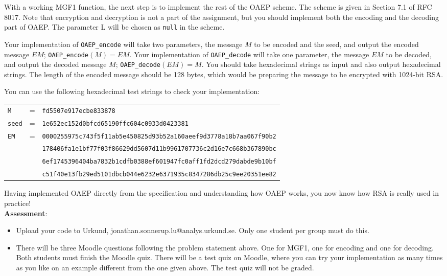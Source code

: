 \documentclass{article}
\begin{document}
\begin{description}
{				With a working MGF1 function, the next step is to implement the rest of the OAEP scheme. The scheme is given in Section 7.1 of RFC 8017. Note that encryption and decryption is not a part of the assignment, but you should implement both the encoding and the decoding part of OAEP. The parameter L will be chosen as \texttt{null} in the scheme.
				
				Your implementation of \texttt{OAEP\_encode} will take two parameters, the message $M$ to be encoded and the seed, and output the encoded message $\textit{EM}$; \texttt{OAEP\_encode}$(M)=\textit{EM}$.
				Your implementation of \texttt{OAEP\_decode} will take one parameter, the message $\textit{EM}$ to be decoded, and output the decoded message $M$; \texttt{OAEP\_decode}$(\textit{EM})=M$. You should take hexadecimal strings as input and also output hexadecimal strings. The length of the encoded message should be 128 bytes, which would be preparing the message to be encrypted with 1024-bit RSA. 
				
				You can use the following hexadecimal test strings to check your implementation:
				\begin{center}
					\begin{tabular}{lcl}
						\texttt{M} & = & \texttt{fd5507e917ecbe833878}\\
						\texttt{seed} & = & \texttt{1e652ec152d0bfcd65190ffc604c0933d0423381}\\
						\texttt{EM} &=& \texttt{0000255975c743f5f11ab5e450825d93b52a160aeef9d3778a18b7aa067f90b2}\\                                 &&\texttt{178406fa1e1bf77f03f86629dd5607d11b9961707736c2d16e7c668b367890bc}\\
						&&\texttt{6ef1745396404ba7832b1cdfb0388ef601947fc0aff1fd2dcd279dabde9b10bf}\\
						&& \texttt{c51f40e13fb29ed5101dbcb044e6232e6371935c8347286db25c9ee20351ee82}\\
					\end{tabular}
				\end{center}
				
				Having implemented OAEP directly from the specification and understanding how OAEP works, you now know how RSA is really used in practice!\\
				\textbf{Assessment}:
				\begin{itemize}
					\item Upload your code to Urkund, jonathan.sonnerup.lu@analys.urkund.se.
					Only one student per group must do this.
					\item There will be three Moodle questions following the problem statement above. One for MGF1, one for encoding and one for decoding. Both students must finish the Moodle quiz.
					There will be a test quiz on Moodle, where you can try your implementation as many times as you like on an example different from the one given above. The test quiz will not be graded.
				\end{itemize}
				
				
			}
		
		\end{description}
		
\end{document}
